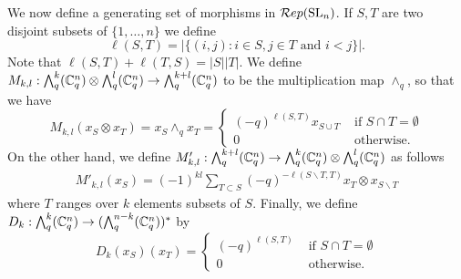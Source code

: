 \documentclass[11pt]{amsart}
\begin{document}
We now define a generating set of morphisms in $\mathcal{R}ep({\rm{SL}}_n)$. If $S, T$ are two disjoint subsets of $ \{1, \dots, n\} $ we define $$ \ell(S, T) = |\{ (i,j) : i \in S, j \in T \text{ and } i < j \}|. $$ Note that $\ell(S,T) + \ell(T,S) = |S||T| $. We define $ M_{k,l} : {\textstyle\bigwedge^{k}_{q}} ({\mathbb{C}}^n_q) \otimes {\textstyle\bigwedge^{l}_{q}}({\mathbb{C}}^n_q) \rightarrow {\textstyle\bigwedge^{k+l}_{q}}({\mathbb{C}}^n_q) $ to be the multiplication map $ \wedge_q $, so that we have
\begin{equation*}
M_{k,l}(x_S \otimes x_T) = x_S \wedge_q x_T = \begin{cases} (-q)^{\ell(S, T)} x_{S \cup T} & \text{ if } S \cap T = \emptyset \\
 0 & \text{ otherwise. }
 \end{cases} 
\end{equation*}
On the other hand, we define $M'_{k,l} :{\textstyle\bigwedge^{k+l}_{q}}({\mathbb{C}}^n_q) \rightarrow {\textstyle\bigwedge^{k}_{q}} ({\mathbb{C}}^n_q) \otimes {\textstyle\bigwedge^{l}_{q}}({\mathbb{C}}^n_q) $ as follows 
\begin{align*}
M'_{k,l}(x_S) = (-1)^{kl} \sum_{T \subset S} (-q)^{-\ell(S \smallsetminus T, T)} x_T \otimes x_{S \smallsetminus T}
\end{align*}
where $ T $ ranges over $ k $ elements subsets of $ S $. Finally, we define $D_k : {\textstyle\bigwedge^{k}_{q}}( {\mathbb{C}}^n_q) \rightarrow ({\textstyle\bigwedge^{n-k}_{q}}  ({\mathbb{C}}^n_q))^*$ by 
$$
 D_k(x_S)(x_T) = \begin{cases} (-q)^{\ell(S, T)} & \text{ if } S \cap T = \emptyset \\
 0 & \text{ otherwise. }
 \end{cases}
$$
\end{document}
